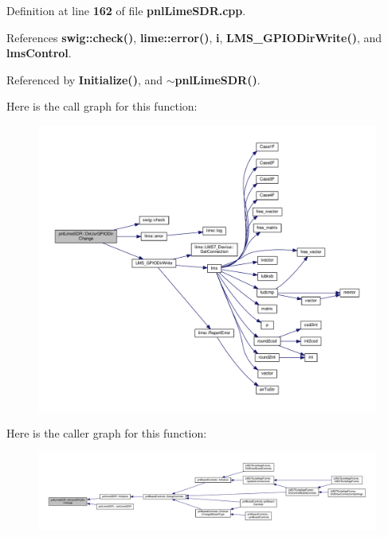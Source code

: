 Definition at line {\bf 162} of file {\bf pnl\+Lime\+S\+D\+R.\+cpp}.



References {\bf swig\+::check()}, {\bf lime\+::error()}, {\bf i}, {\bf L\+M\+S\+\_\+\+G\+P\+I\+O\+Dir\+Write()}, and {\bf lms\+Control}.



Referenced by {\bf Initialize()}, and {\bf $\sim$pnl\+Lime\+S\+D\+R()}.



Here is the call graph for this function\+:
\nopagebreak
\begin{figure}[H]
\begin{center}
\leavevmode
\includegraphics[width=350pt]{de/d23/classpnlLimeSDR_af8f59e014c5bb8bfd5fc11c5e9358a3d_cgraph}
\end{center}
\end{figure}




Here is the caller graph for this function\+:
\nopagebreak
\begin{figure}[H]
\begin{center}
\leavevmode
\includegraphics[width=350pt]{de/d23/classpnlLimeSDR_af8f59e014c5bb8bfd5fc11c5e9358a3d_icgraph}
\end{center}
\end{figure}


